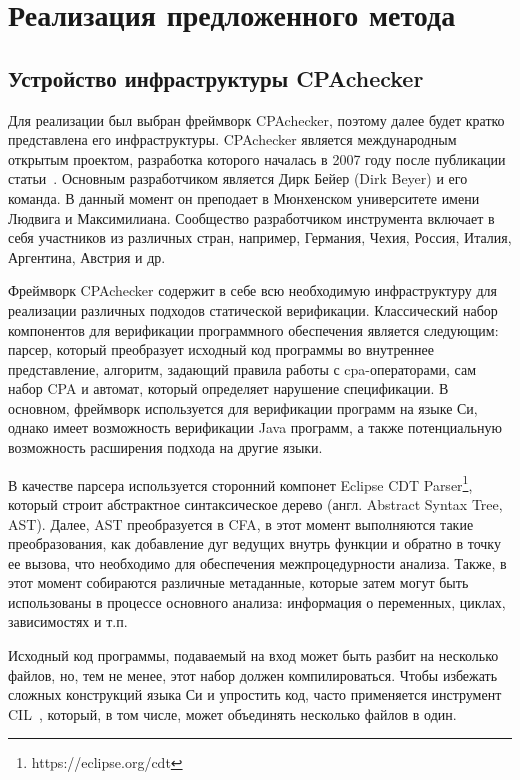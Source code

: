 \chapter{Реализация предложенного метода}
\label{chapter_implementation}

\section{Устройство инфраструктуры CPAchecker}
\label{sect_impl_cpachecker}

Для реализации был выбран фреймворк CPAchecker, поэтому далее будет кратко представлена его инфраструктуры.
CPAchecker является международным открытым проектом, разработка которого началась в 2007 году после публикации статьи~\cite{BeyerCPA07}.
Основным разработчиком является Дирк Бейер (Dirk Beyer) и его команда.
В данный момент он преподает в Мюнхенском университете имени Людвига и Максимилиана.
Сообщество разработчиком инструмента включает в себя участников из различных стран, например, Германия, Чехия, Россия, Италия, Аргентина, Австрия и др.

Фреймворк CPAchecker содержит в себе всю необходимую инфраструктуру для реализации различных подходов статической верификации.
Классический набор компонентов для верификации программного обеспечения является следующим: парсер, который преобразует исходный код программы во внутреннее представление, алгоритм, задающий правила работы с cpa-операторами, сам набор CPA и автомат, который определяет нарушение спецификации.
В основном, фреймворк используется для верификации программ на языке Си, однако имеет возможность верификации Java программ, а также потенциальную возможность расширения подхода на другие языки.

В качестве парсера используется сторонний компонет Eclipse CDT Parser\footnote{https://eclipse.org/cdt}, который строит абстрактное синтаксическое дерево (англ. Abstract Syntax Tree, AST).
Далее, AST преобразуется в CFA, в этот момент выполняются такие преобразования, как добавление дуг ведущих внутрь функции и обратно в точку ее вызова, что необходимо для обеспечения межпроцедурности анализа.
Также, в этот момент собираются различные метаданные, которые затем могут быть использованы в процессе основного анализа: информация о переменных, циклах, зависимостях и т.п.

Исходный код программы, подаваемый на вход может быть разбит на несколько файлов, но, тем не менее, этот набор должен компилироваться.
Чтобы избежать сложных конструкций языка Си и упростить код, часто применяется инструмент CIL~\cite{CIL}, который, в том числе, может объединять несколько файлов в один.

